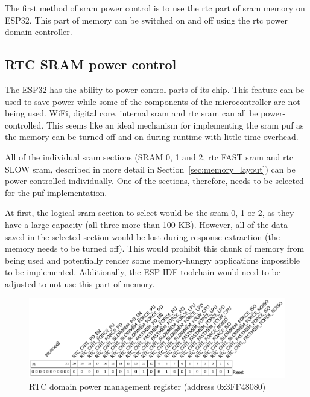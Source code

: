 The first method of \gls{sram} power control is to use the \gls{rtc} part of \gls{sram} memory on ESP32. This part of memory can be switched on and off using the \gls{rtc} power domain controller.
 
\subsection{RTC SRAM power control}

The ESP32 has the ability to power-control parts of its chip. This feature can be used to save power while some of the components of the microcontroller are not being used. WiFi, digital core, internal \gls{sram} and \gls{rtc} \gls{sram} can all be power-controlled. This seems like an ideal mechanism for implementing the \gls{sram} \gls{puf} as the memory can be turned off and on during runtime with little time overhead.~\cite{esp322021}

All of the individual \gls{sram} sections (SRAM 0, 1 and 2, \gls{rtc} FAST \gls{sram} and \gls{rtc} SLOW \gls{sram}, described in more detail in Section~\ref{sec:memory_layout}) can be power-controlled individually. One of the sections, therefore, needs to be selected for the \gls{puf} implementation.

At first, the logical \gls{sram} section to select would be the \gls{sram} 0, 1 or 2, as they have a large capacity (all three more than 100 KB). However, all of the data saved in the selected section would be lost during response extraction (the memory needs to be turned off). This would prohibit this chunk of memory from being used and potentially render some memory-hungry applications impossible to be implemented. Additionally, the ESP-IDF toolchain would need to be adjusted to not use this part of memory. 

\begin{figure}[ht!]
    \centering
    \captionsetup{justification=centering,margin=0.5cm}
    \includegraphics[width=\textwidth]{images/rtc_register.pdf}
    \caption[RTC domain power management register (address 0x3FF48080)]{RTC domain power management register (address 0x3FF48080)~\cite{esp322021}}
    \label{fig:rtc_register}
\end{figure}

